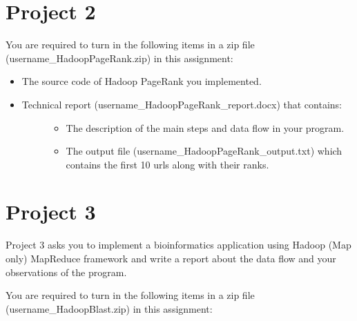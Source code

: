 


\chapter{Project 2}\label{project-2}

You are required to turn in the following items in a zip file
(username\_HadoopPageRank.zip) in this assignment:

\begin{itemize}
\item
  The source code of Hadoop PageRank you implemented.
\item
  \begin{description}
  \item[Technical report (username\_HadoopPageRank\_report.docx) that
  contains:]
  \begin{itemize}
  \tightlist
  \item
    The description of the main steps and data flow in your program.
  \item
    The output file (username\_HadoopPageRank\_output.txt) which
    contains the first 10 urls along with their ranks.
  \end{itemize}
  \end{description}
\end{itemize}



\chapter{Project 3}\label{project-3}

Project 3 asks you to implement a bioinformatics application using
Hadoop (Map only) MapReduce framework and write a report about the data
flow and your observations of the program.

You are required to turn in the following items in a zip file
(username\_HadoopBlast.zip) in this assignment:

